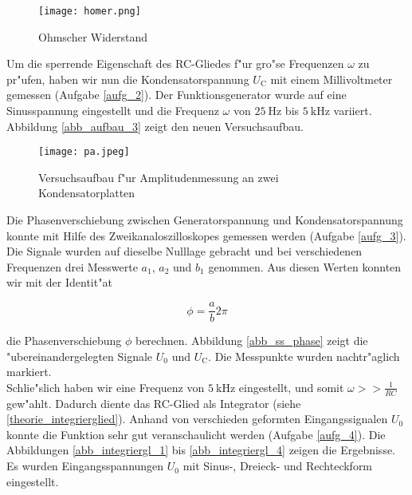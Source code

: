 \documentclass{scrartcl}
\begin{document}
			\begin{figure}[ht]
				\centering
				\texttt{[image: homer.png]}
					\caption {Ohmscher Widerstand}
			\end{figure}

			Um die sperrende Eigenschaft des RC-Gliedes f"ur gro"se Frequenzen $\omega$ zu pr"ufen, haben wir nun die Kondensatorspannung $U_{\mathrm{C}}$ mit einem Millivoltmeter gemessen (Aufgabe \ref{aufg_2}).
			Der Funktions\-generator wurde auf eine Sinusspannung eingestellt und die Frequenz $\omega$ von $\SI{25}{\hertz}$ bis $\SI{5}{\kilo\hertz}$ variiert. Abbildung \ref{abb_aufbau_3} zeigt den neuen Versuchsaufbau. \\

			\begin{figure}[ht]
				\centering
				\texttt{[image: pa.jpeg]}
					\caption {Versuchsaufbau f"ur Amplitudenmessung an zwei Kondensatorplatten}
			\end{figure}

			Die Phasenverschiebung zwischen Generatorspannung und Kondensatorspannung konnte mit Hilfe des Zweikanaloszilloskopes gemessen werden (Aufgabe \ref{aufg_3}).
			Die Signale wurden auf dieselbe Nulllage gebracht und bei verschiedenen Frequenzen drei Messwerte $a_1$, $a_2$ und $b_1$ genommen.
			Aus diesen Werten konnten wir mit der Identit"at

			\begin{equation}
				\phi = \frac{a}{b} 2 \pi
			\end{equation}

			die Phasenverschiebung $\phi$ berechnen.
			Abbildung \ref{abb_ss_phase} zeigt die "ubereinandergelegten Signale $U_0$ und $U_{\mathrm{C}}$. Die Messpunkte wurden nachtr"aglich markiert.\\

			Schlie"slich haben wir eine Frequenz von $\SI{5}{\kilo\hertz}$ eingestellt, und somit $\omega >> \frac{1}{RC}$ gew"ahlt.
			Dadurch diente das RC-Glied als Integrator (siehe \ref{theorie_integrierglied}).
			Anhand von verschieden geformten Eingangssignalen $U_0$ konnte die Funktion sehr gut veranschaulicht werden (Aufgabe \ref{aufg_4}).
			Die Abbildungen \ref{abb_integriergl_1} bis \ref{abb_integriergl_4} zeigen die Ergebnisse.
			Es wurden Eingangsspannungen $U_0$ mit Sinus-, Dreieck- und Rechteckform eingestellt.
\end{document}
